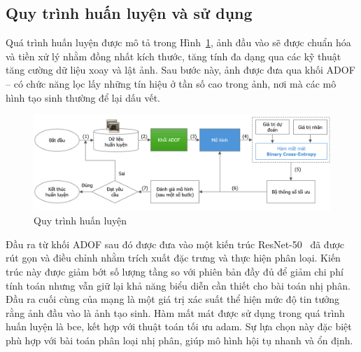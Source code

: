 \subsection{Quy trình huấn luyện và sử dụng}
%
\label{ssec:quy_trinh_huan_luyen}
%
Quá trình huấn luyện được mô tả trong Hình~\ref{fig:offline-training-process}, ảnh đầu vào sẽ được chuẩn hóa và tiền xử lý nhằm đồng nhất kích thước, tăng tính đa dạng qua các kỹ thuật tăng cường dữ liệu xoay và lật ảnh. Sau bước này, ảnh được đưa qua khối {ADOF} – có chức năng lọc lấy những tín hiệu ở tần số cao trong ảnh, nơi mà các mô hình tạo sinh thường để lại dấu vết.
%
\begin{figure}[h!]
	\centering
	\includegraphics[width=1.0\linewidth]{Images/offline-training-process.png}
	\begin{minipage}{1.0\linewidth}
		\vspace{3mm}
		\caption{Quy trình huấn luyện}
		\label{fig:offline-training-process}
	\end{minipage}
\end{figure}
%
Đầu ra từ khối {ADOF} sau đó được đưa vào một kiến trúc ResNet-50~\cite{He2015DeepRL} đã được rút gọn và điều chỉnh nhằm trích xuất đặc trưng và thực hiện phân loại. Kiến trúc này được giảm bớt số lượng tầng so với phiên bản đầy đủ để giảm chi phí tính toán nhưng vẫn giữ lại khả năng biểu diễn cần thiết cho bài toán nhị phân. Đầu ra cuối cùng của mạng là một giá trị xác suất thể hiện mức độ tin tưởng rằng ảnh đầu vào là ảnh tạo sinh. Hàm mất mát được sử dụng trong quá trình huấn luyện là \gls{bce}, kết hợp với thuật toán tối ưu \gls{adam}. Sự lựa chọn này đặc biệt phù hợp với bài toán phân loại nhị phân, giúp mô hình hội tụ nhanh và ổn định. 

